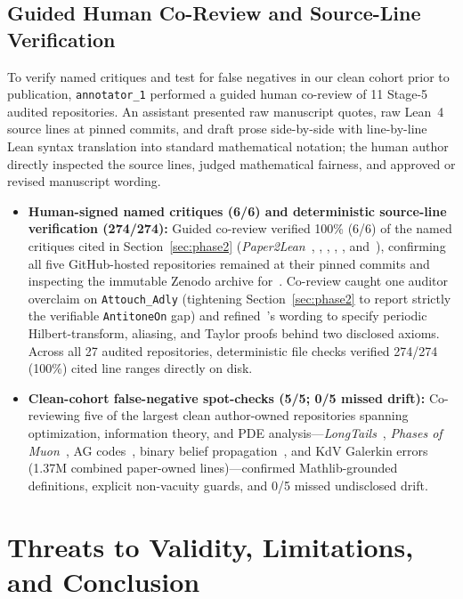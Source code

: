 \documentclass[11pt,letterpaper]{article}
\begin{document}
\subsection{Guided Human Co-Review and Source-Line Verification}
To verify named critiques and test for false negatives in our clean cohort prior to publication, \texttt{annotator\_1} performed a guided human co-review of 11 Stage-5 audited repositories. An assistant presented raw manuscript quotes, raw Lean~4 source lines at pinned commits, and draft prose side-by-side with line-by-line Lean syntax translation into standard mathematical notation; the human author directly inspected the source lines, judged mathematical fairness, and approved or revised manuscript wording.
\begin{itemize}
  \item \textbf{Human-signed named critiques (6/6) and deterministic source-line verification (274/274):} Guided co-review verified 100\% (6/6) of the named critiques cited in Section~\ref{sec:phase2} (\emph{Paper2Lean}~\cite{arxiv2611_26272}, \cite{arxiv2611_04876}, \cite{arxiv2605_14610}, \cite{arxiv2605_02856}, \cite{arxiv2611_07395}, and~\cite{arxiv2611_14586}), confirming all five GitHub-hosted repositories remained at their pinned commits and inspecting the immutable Zenodo archive for~\cite{arxiv2611_14586}. Co-review caught one auditor overclaim on \texttt{Attouch\_Adly} (tightening Section~\ref{sec:phase2} to report strictly the verifiable \texttt{AntitoneOn} gap) and refined~\cite{arxiv2611_07395}'s wording to specify periodic Hilbert-transform, aliasing, and Taylor proofs behind two disclosed axioms. Across all 27 audited repositories, deterministic file checks verified 274/274 (100\%) cited line ranges directly on disk.
  \item \textbf{Clean-cohort false-negative spot-checks (5/5; 0/5 missed drift):} Co-reviewing five of the largest clean author-owned repositories spanning optimization, information theory, and PDE analysis---\emph{LongTails}~\cite{arxiv2611_13872}, \emph{Phases of Muon}~\cite{arxiv2605_09552}, AG codes~\cite{arxiv2611_08172}, binary belief propagation~\cite{arxiv2611_11713}, and KdV Galerkin errors~\cite{arxiv2611_12585} (1.37M combined paper-owned lines)---confirmed Mathlib-grounded definitions, explicit non-vacuity guards, and 0/5 missed undisclosed drift.
\end{itemize}

\section{Threats to Validity, Limitations, and Conclusion}
\label{sec:limitations}
\end{document}
